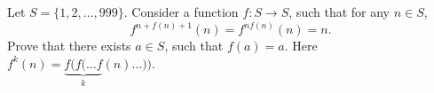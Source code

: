 Let $S=\{1,2,\ldots ,999\}$. Consider a function $f: S\to S$, such that for any $n\in S$,$$f^{n+f(n)+1}(n)=f^{nf(n)}(n)=n.$$Prove that there exists $a\in S$, such that $f(a)=a$. Here $f^k(n) = \underbrace{f(f(\ldots f}_{k}(n)\ldots))$.